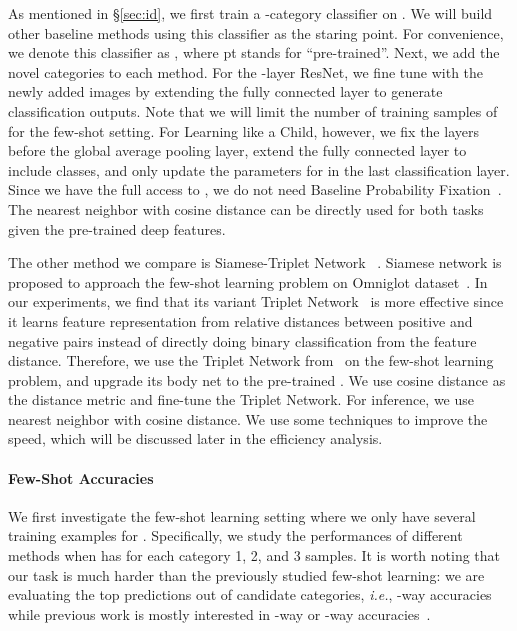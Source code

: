 As mentioned in \S\ref{sec:id}, we first train a -category classifier on .
We will build other baseline methods using this classifier as the staring point. For convenience, we denote this classifier as \smash{}, where pt stands for ``pre-trained''.
Next, we add the novel categories  to each method. For the -layer ResNet, we fine tune \smash{} with the newly added images by extending the fully connected layer to generate  classification outputs. Note that we will limit the number of training samples of  for the few-shot setting.
For Learning like a Child, however, we fix the layers before the global average pooling layer, extend the fully connected layer to include  classes, and only update the parameters for  in the last classification layer.
Since we have the full access to , we do not need Baseline Probability
Fixation~\cite{mao2015learning}. The nearest neighbor with cosine distance can be directly used for both tasks given the pre-trained deep features.

The other method we compare is Siamese-Triplet Network ~\cite{siamese,lin2017transfer}. Siamese network is proposed to approach the few-shot learning problem on Omniglot dataset~\cite{DBLP:conf/cogsci/LakeSGT11}.
In our experiments, we find that its variant Triplet Network~\cite{lin2017transfer,DBLP:conf/iccv/WangG15} is more effective since it learns feature representation from relative distances between positive and negative pairs instead of directly doing binary classification from the feature distance. Therefore, we use the Triplet Network from~\cite{lin2017transfer} on the few-shot learning problem, and upgrade its body net to the pre-trained \smash{}. We use cosine distance as the distance metric and fine-tune the Triplet Network. For inference, we use nearest neighbor with cosine distance.
We use some techniques to improve the speed, which will be discussed later in the efficiency analysis.

\paragraph{Few-Shot Accuracies}
We first investigate the few-shot learning setting where we only have several training examples for . Specifically, we study the performances of different methods when  has for each category 1, 2, and 3 samples.
It is worth noting that our task is much harder than the previously studied few-shot learning: we are evaluating the top predictions out of  candidate categories, \textit{i.e.}, -way accuracies while previous work is mostly interested in -way or -way accuracies~\cite{pmlr-v70-finn17a,siamese,lin2017transfer,ravi2017optimization,DBLP:conf/nips/VinyalsBLKW16}.

